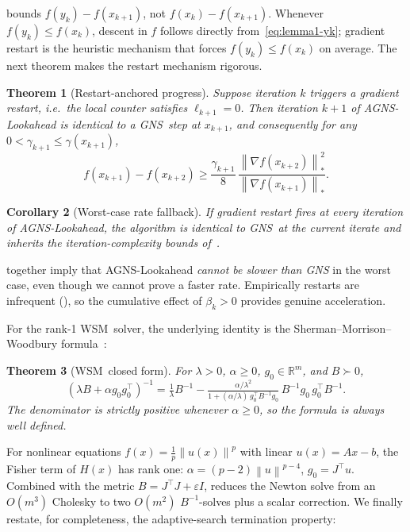 \documentclass[conference]{IEEEtran}
\newtheorem{theorem}{Theorem}
\newtheorem{corollary}[theorem]{Corollary}
\theoremstyle{remark}
\newcommand{\R}{\mathbb{R}}
\newcommand{\dnorm}[1]{\left\lVert#1\right\rVert_*}
\newcommand{\norm}[1]{\left\lVert#1\right\rVert}
\newcommand{\AGNS}{\textsc{AGNS}}
\newcommand{\GNS}{\textsc{GNS}}
\newcommand{\WSM}{\textsc{WSM}}
\begin{document}
 bounds $f(y_k) - f(x_{k+1})$, not
$f(x_k) - f(x_{k+1})$. Whenever $f(y_k) \le f(x_k)$, descent in $f$
follows directly from~\eqref{eq:lemma1-yk}; gradient restart is the
heuristic mechanism that forces $f(y_k) \le f(x_k)$ on average. The
next theorem makes the restart mechanism rigorous.

\begin{theorem}[Restart-anchored progress]
\label{thm:restart-anchored}
Suppose iteration $k$ triggers a gradient restart, i.e.\ the local
counter satisfies $\ell_{k+1} = 0$. Then iteration $k{+}1$ of
\AGNS-Lookahead is identical to a \GNS\ step at $x_{k+1}$, and
consequently for any $0 < \gamma_{k+1} \le \gamma(x_{k+1})$,
\[
  f(x_{k+1}) - f(x_{k+2}) \ge \frac{\gamma_{k+1}}{8}\,
    \frac{\dnorm{\nabla f(x_{k+2})}^2}{\dnorm{\nabla f(x_{k+1})}}.
\]
\end{theorem}

\begin{corollary}[Worst-case rate fallback]
\label{cor:fallback}
If gradient restart fires at every iteration of \AGNS-Lookahead, the
algorithm is identical to \GNS\ at the current iterate and inherits
the iteration-complexity bounds
of~\cite[Thm.~1, Thm.~2]{semenov2025gradient}.
\end{corollary}

 together imply that
\AGNS-Lookahead \emph{cannot be slower than \GNS} in the worst case,
even though we cannot prove a faster rate. Empirically restarts are
infrequent (), so the cumulative effect of
$\beta_k > 0$ provides genuine acceleration.

For the rank-1 \WSM\ solver, the underlying identity is the
Sherman--Morrison--Woodbury formula~\cite{sherman1950inverting}:

\begin{theorem}[\WSM\ closed form]
\label{thm:wsm}
For $\lambda > 0$, $\alpha \ge 0$, $g_0 \in \R^m$, and $B \succ 0$,
\begin{equation}
\label{eq:wsm-formula}
(\lambda B + \alpha g_0 g_0^\top)^{-1}
\!=\! \tfrac{1}{\lambda} B^{-1}
- \tfrac{\alpha/\lambda^2}{1 + (\alpha/\lambda)\, g_0^\top B^{-1} g_0}\,
  B^{-1} g_0\, g_0^\top B^{-1}.
\end{equation}
The denominator is strictly positive whenever $\alpha \ge 0$, so the
formula is always well defined.
\end{theorem}

For nonlinear equations $f(x) = \tfrac{1}{p}\norm{u(x)}^p$ with
linear $u(x) = Ax - b$, the Fisher term of $H(x)$ has rank one:
$\alpha = (p-2)\norm{u}^{p-4}$, $g_0 = J^\top u$. Combined with the
metric $B = J^\top J + \varepsilon I$,  reduces the
Newton solve from an $O(m^3)$ Cholesky to two $O(m^2)$ $B^{-1}$-solves
plus a scalar correction. We finally restate, for completeness, the
adaptive-search termination property:
\end{document}
